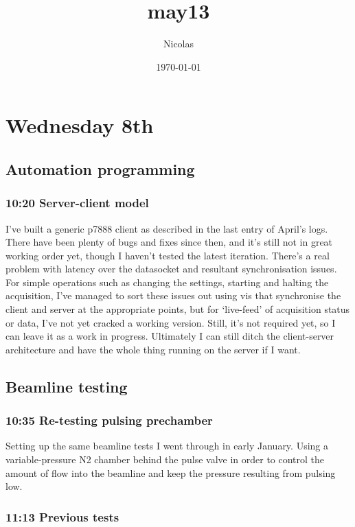 \documentclass[11pt]{article}
\title{may13}
\author{Nicolas}
\date{\today}
\begin{document}
\maketitle


\section*{Wednesday 8th}
\label{sec-1}
\subsection*{Automation programming}
\label{sec-1-1}
\subsubsection*{10:20 Server-client model}
\label{sec-1-1-1}

I've built a generic p7888 client as described in the last entry of
April's logs. There have been plenty of bugs and fixes since then, and
it's still not in great working order yet, though I haven't tested the
latest iteration. There's a real problem with latency over the
datasocket and resultant synchronisation issues. For simple operations
such as changing the settings, starting and halting the acquisition,
I've managed to sort these issues out using vis that synchronise the
client and server at the appropriate points, but for `live-feed' of
acquisition status or data, I've not yet cracked a working
version. Still, it's not required yet, so I can leave it as a work in
progress. Ultimately I can still ditch the client-server architecture
and have the whole thing running on the server if I want. 
\subsection*{Beamline testing}
\label{sec-1-2}
\subsubsection*{10:35 Re-testing pulsing prechamber}
\label{sec-1-2-1}

Setting up the same beamline tests I went through in early
January. Using a variable-pressure N2 chamber behind the pulse valve
in order to control the amount of flow into the beamline and keep the
pressure resulting from pulsing low. 
\subsubsection*{11:13 Previous tests}
\label{sec-1-2-2}
\end{document}

